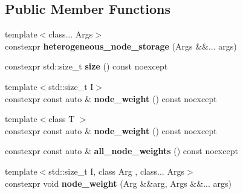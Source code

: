 \subsection*{Public Member Functions}
\begin{DoxyCompactItemize}
\item 
\mbox{\label{classsequoia_1_1maths_1_1graph__impl_1_1heterogeneous__node__storage_aa3bfa992bdcd88bc1b1ec518ac1260bf}} 
{\footnotesize template$<$class... Args$>$ }\\constexpr {\bfseries heterogeneous\+\_\+node\+\_\+storage} (Args \&\&... args)
\item 
\mbox{\label{classsequoia_1_1maths_1_1graph__impl_1_1heterogeneous__node__storage_a9e1005a93d6914c0cdd6723e634fa97e}} 
constexpr std\+::size\+\_\+t {\bfseries size} () const noexcept
\item 
\mbox{\label{classsequoia_1_1maths_1_1graph__impl_1_1heterogeneous__node__storage_a60fd4426ba6cba8916d5a0f7011a5ddf}} 
{\footnotesize template$<$std\+::size\+\_\+t I$>$ }\\constexpr const auto \& {\bfseries node\+\_\+weight} () const noexcept
\item 
\mbox{\label{classsequoia_1_1maths_1_1graph__impl_1_1heterogeneous__node__storage_a60fd4426ba6cba8916d5a0f7011a5ddf}} 
{\footnotesize template$<$class T $>$ }\\constexpr const auto \& {\bfseries node\+\_\+weight} () const noexcept
\item 
\mbox{\label{classsequoia_1_1maths_1_1graph__impl_1_1heterogeneous__node__storage_ad3f366c48813ea3577d6f4919895447a}} 
constexpr const auto \& {\bfseries all\+\_\+node\+\_\+weights} () const noexcept
\item 
\mbox{\label{classsequoia_1_1maths_1_1graph__impl_1_1heterogeneous__node__storage_ab181e0313e08076845ba895583df8f10}} 
{\footnotesize template$<$std\+::size\+\_\+t I, class Arg , class... Args$>$ }\\constexpr void {\bfseries node\+\_\+weight} (Arg \&\&arg, Args \&\&... args)

\end{DoxyCompactItemize}
